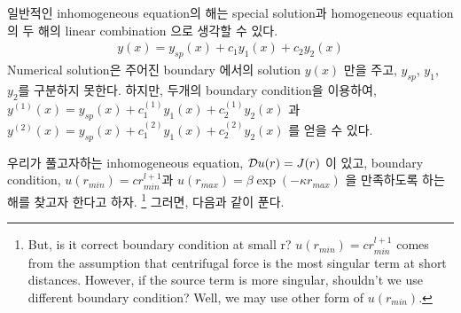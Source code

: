 \documentclass[10pt]{book}
\newcommand{\bea}{\begin{eqnarray}}
\newcommand{\eea}{\end{eqnarray}}
\begin{document}
일반적인 inhomogeneous equation의 해는 special solution과 homogeneous equation의 
두 해의 linear combination 으로 생각할 수 있다. 
\bea 
y(x)=y_{sp}(x)+c_1 y_1(x)+c_2 y_2(x)
\eea 
Numerical solution은 주어진 boundary 에서의 solution $y(x)$ 만을 주고, 
$y_{sp}$, $y_1$, $y_2$를 구분하지 못한다.  하지만, 두개의 boundary condition을 이용하여,
$y^{(1)}(x)=y_{sp}(x)+c^{(1)}_1 y_1(x)+c^{(1)}_2 y_2(x)$
과 $y^{(2)}(x)=y_{sp}(x)+c^{(2)}_1 y_1(x)+c^{(2)}_2 y_2(x)$ 를 얻을 수 있다. 


우리가 풀고자하는 inhomogeneous equation, ${\cal D}u(r)=J(r)$ 이 있고, 
boundary condition, $u(r_{min})= c r_{min}^{l+1}$과 
$u(r_{max})= \beta \exp(-\kappa r_{max})$ 을 만족하도록 하는 해를 찾고자 한다고 하자. 
\footnote{But, is it correct boundary condition at small r? 
$u(r_{min})= c r_{min}^{l+1}$ comes from the assumption that centrifugal force
is the most singular term at short distances. However, if the source term is 
more singular, shouldn't we use different boundary condition?
Well, we may use other form of $u(r_{min})$. 
} 
그러면, 다음과 같이 푼다. 
\end{document}
